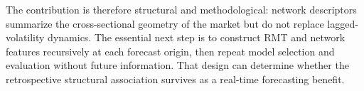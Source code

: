 The contribution is therefore structural and methodological: network descriptors summarize the cross-sectional geometry of the market but do not replace lagged-volatility dynamics. The essential next step is to construct RMT and network features recursively at each forecast origin, then repeat model selection and evaluation without future information. That design can determine whether the retrospective structural association survives as a real-time forecasting benefit.
